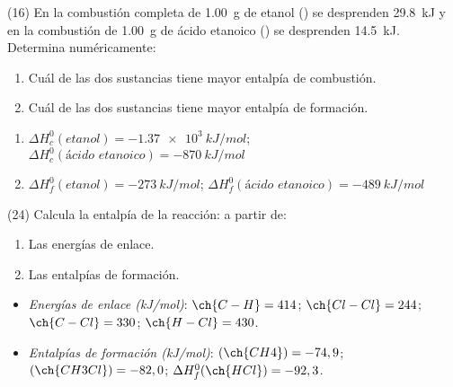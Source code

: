 \documentclass[10pt]{article}
\newenvironment{gexdatos}{
  \noindent\makebox[0pt][r]{\textit{Datos:}}
  }{\vspace{5pt}}
\begin{document}
\begin{multicols}{2}
\begin{exercise}[
    tags    = {},
    topics  = {química,química básica},
    source  = {FQ 1B MGH 2016, p85, e26},
  ]
  (16) En la combustión completa de \SI{1.00}{\gram} de etanol () se desprenden \SI{29.8}{kJ} y en la combustión de \SI{1.00}{\gram}
  de ácido etanoico () se desprenden \SI{14.5}{kJ}.
  Determina numéricamente:
  \begin{enumerate}
    \item Cuál de las dos sustancias tiene mayor entalpía de combustión.
    \item Cuál de las dos sustancias tiene mayor entalpía de formación.
  \end{enumerate}
\end{exercise}

\begin{solution}
  \begin{enumerate}
    \item \( \Delta H^0_c (\textit{etanol}) = \SI{-1.37e3}{kJ/mol} \);
          \( \Delta H^0_c (\textit{ácido etanoico}) = \SI{-870}{kJ/mol} \)
    \item \( \Delta H^0_f (\textit{etanol}) = \SI{-273}{kJ/mol} \); \newline
          \( \Delta H^0_f (\textit{ácido etanoico}) = \SI{-489}{kJ/mol} \)
  \end{enumerate}
\end{solution}




\begin{exercise}[
    tags    = {},
    topics  = {química,química básica},
    source  = {FQ 1B MGH 2016, p85, e26},
  ]

  (24) Calcula la entalpía de la reacción:
   a partir de:
  \begin{enumerate}
    \item Las energías de enlace.
    \item Las entalpías de formación.
  \end{enumerate}

  \begin{gexdatos}
    \begin{itemize}
      \item \textit{Energías de enlace (\si{kJ/mol})}:
      \( \ch{C-H} = 414 \); \( \ch{Cl-Cl} = 244 \); \( \ch{C-Cl} = 330 \); \( \ch{H-Cl} = 430 \).
      \item \textit{Entalpías de formación (\si{kJ/mol})}:
      \( (\ch{CH4}) = -74,9 \); \( (\ch{CH3Cl}) = -82,0 \); \( \Delta H^0_f (\ch{HCl}) = -92,3 \).
    \end{itemize}
  \end{gexdatos}


\end{exercise}
\end{multicols}
\end{document}
